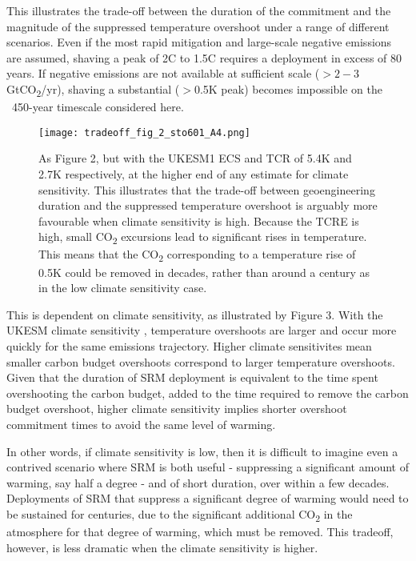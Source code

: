 \documentclass[draft]{agujournal2019}
\begin{document}
This illustrates the trade-off between the duration of the commitment and the magnitude of the suppressed temperature overshoot under a range of different scenarios. Even if the most rapid mitigation and large-scale negative emissions are assumed, shaving a peak of 2C to 1.5C requires a deployment in excess of 80 years. If negative emissions are not available at sufficient scale ($>2-3$GtCO\textsubscript{2}/yr), shaving a substantial ($>$0.5K peak) becomes impossible on the ~450-year timescale considered here. 

\medskip

\begin{figure}[!h]
  \texttt{[image: tradeoff\_fig\_2\_sto601\_A4.png]}
  \caption{As Figure 2, but with the UKESM1 ECS and TCR of 5.4K and 2.7K respectively, at the higher end of any estimate for climate sensitivity. This illustrates that the trade-off between geoengineering duration and the suppressed temperature overshoot is arguably more favourable when climate sensitivity is high. Because the TCRE is high, small CO\textsubscript{2} excursions lead to significant rises in temperature. This means that the CO\textsubscript{2} corresponding to a temperature rise of 0.5K could be removed in decades, rather than around a century as in the low climate sensitivity case.}
  \label{fig:tradeoff_fig_2.png}
\end{figure}




\medskip

This is dependent on climate sensitivity, as illustrated by Figure 3. With the UKESM climate sensitivity \cite{doi:10.1029/2019MS001739},  temperature overshoots are larger and occur more quickly for the same emissions trajectory. Higher climate sensitivites mean smaller carbon budget overshoots correspond to larger temperature overshoots. Given that the duration of SRM deployment is equivalent to the time spent overshooting the carbon budget, added to the time required to remove the carbon budget overshoot, higher climate sensitivity implies shorter overshoot commitment times to avoid the same level of warming. 

\medskip

In other words, if climate sensitivity is low, then it is difficult to imagine even a contrived scenario where SRM is both useful - suppressing a significant amount of warming, say half a degree - and of short duration, over within a few decades. Deployments of SRM that suppress a significant degree of warming would need to be sustained for centuries, due to the significant additional CO\textsubscript{2} in the atmosphere for that degree of warming, which must be removed. This tradeoff, however, is less dramatic when the climate sensitivity is higher. 
\end{document}

